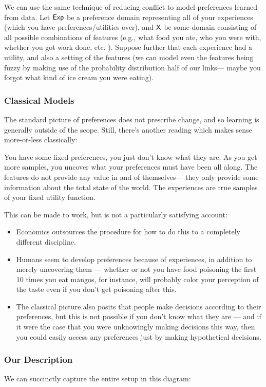 \documentclass{article}
\begin{document}
	We can use the same technique of reducing conflict to model preferences learned from data. Let $\sf Exp$ be a preference domain representing all of your experiences (which you have preferences/utilities over), and $\sf X$ be some domain consisting of all possible combinations of features (e.g., what food you ate, who you were with, whether you got work done, etc. ). Suppose further that each experience had a utility, and also a setting of the features (we can model even the features being fuzzy by making use of the probability distribution half of our links--- maybe you forgot what kind of ice cream you were eating). 
	
	\subsubsection{Classical Models}
	The standard picture of preferences does not prescribe change, and so learning is generally outside of the scope. Still, there's another reading which makes sense more-or-less classically:
	
	You have some fixed preferences, you just don't know what they are. As you get more samples, you uncover what your preferences must have been all along. The features do not provide any value in and of themselves--- they only provide some information about the total state of the world. The experiences are true samples of your fixed utility function. 
	
	This can be made to work, but is not a particularly satisfying account:
	\begin{itemize}[nosep]
		\item Economics outsources the procedure for how to do this to a completely different discipline.
		\item Humans seem to develop preferences because of experiences, in addition to merely uncovering them --- whether or not you have food poisoning the first 10 times you eat mangos, for instance, will probably color your perception of the taste even if you don't get poisoning after this.
		\item The classical picture also posits that people make decisions according to their preferences, but this is not possible if you don't know what they are --- and if it were the case that you were unknowingly making decisions this way, then you could easily access any preferences just by making hypothetical decisions.
	\end{itemize}
	
	\subsubsection{Our Description}
	We can succinctly capture the entire setup in this diagram:
	
\end{document}
